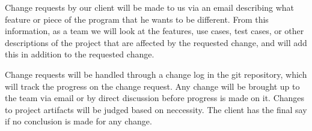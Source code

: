 Change requests by our client will be made to us via an email describing what feature or piece of the program that he wants to be different. From this information, as a team we will look at the features, use cases, test cases, or other descriptions of the project that are affected by the requested change, and will add this in addition to the requested change.

Change requests will be handled through a change log in the git repository, which will track the progress on the change request. Any change will be brought up to the team via email or by direct discussion before progress is made on it. Changes to project artifacts will be judged based on neccessity. The client has the final say if no conclusion is made for any change.
